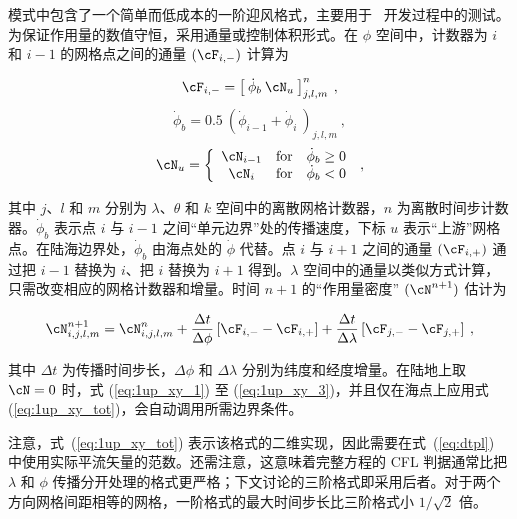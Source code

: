 
\vspace{\baselineskip} 
\vspace{\baselineskip} 


\noindent
模式中包含了一个简单而低成本的一阶迎风格式，主要用于 \ws\ 开发过程中的测试。为保证作用量的数值守恒，采用通量或控制体积形式。在 $\phi$ 空间中，计数器为 $i$ 和 $i-1$ 的网格点之间的通量 $(\cF_{i,-})$ 计算为


\begin{equation}
\cF_{i,-} = \left [ \: \dot{\phi}_b \: \cN_u \: \right ]^n_{j,l,m}
\: , \label{eq:1up_xy_1} \end{equation} \begin{equation}
\dot{\phi}_b = 0.5 \: \left ( \dot{\phi}_{i-1} + \dot{\phi}_i 
\: \right )_{j,l,m} \: , \label{eq:1up_xy_2}
\end{equation} \begin{equation}
\cN_u = \left \{ \begin{array}{ccc}
\cN_{i-1} & \mbox{for} & \dot{\phi}_b \geq 0 \\
\cN_i     & \mbox{for} & \dot{\phi}_b   <  0
\end{array} \right . \: , \label{eq:1up_xy_3}
\end{equation}

\noindent
其中 $j$、$l$ 和 $m$ 分别为 $\lambda$、$\theta$ 和 $k$ 空间中的离散网格计数器，$n$ 为离散时间步计数器。$\dot{\phi}_b$ 表示点 $i$ 与 $i-1$ 之间“单元边界”处的传播速度，下标 $u$ 表示“上游”网格点。在陆海边界处，$\dot{\phi}_b$ 由海点处的 $\dot{\phi}$ 代替。点 $i$ 与 $i+1$ 之间的通量 $(\cF_{i,+})$ 通过把 $i-1$ 替换为 $i$、把 $i$ 替换为 $i+1$ 得到。$\lambda$ 空间中的通量以类似方式计算，只需改变相应的网格计数器和增量。时间 $n+1$ 的“作用量密度” $(\cN^{n+1})$ 估计为


\begin{equation}
\cN_{i,j,l,m}^{n+1} = \cN_{i,j,l,m}^n
  + \frac{\Delta t}{\Delta \phi   } \left [ \cF_{i,-} - \cF_{i,+} \right ]
  + \frac{\Delta t}{\Delta \lambda} \left [ \cF_{j,-} - \cF_{j,+} \right ]
\: , \label{eq:1up_xy_tot}
\end{equation}

\noindent
其中 $\Delta t$ 为传播时间步长，$\Delta \phi$ 和 $\Delta \lambda$ 分别为纬度和经度增量。在陆地上取 $\cN=0$ 时，式 (\ref{eq:1up_xy_1}) 至 (\ref{eq:1up_xy_3})，并且仅在海点上应用式 (\ref{eq:1up_xy_tot})，会自动调用所需边界条件。

注意，式~(\ref{eq:1up_xy_tot}) 表示该格式的二维实现，因此需要在式~(\ref{eq:dtpl}) 中使用实际平流矢量的范数。还需注意，这意味着完整方程的 CFL 判据通常比把 $\lambda$ 和 $\phi$ 传播分开处理的格式更严格；下文讨论的三阶格式即采用后者。对于两个方向网格间距相等的网格，一阶格式的最大时间步长比三阶格式小 $1/\sqrt{2}$ 倍。
